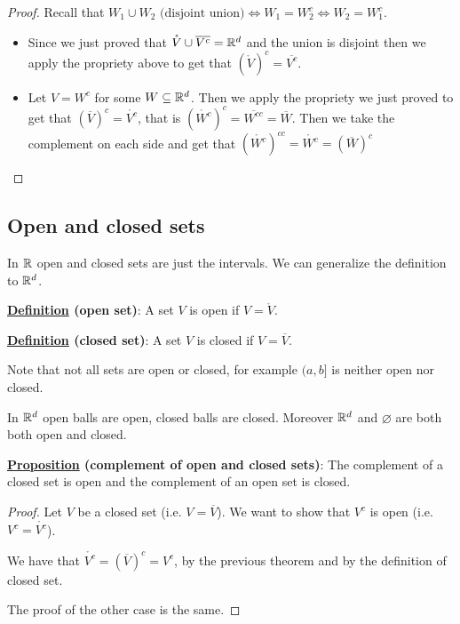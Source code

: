 \documentclass[10pt]{extarticle}
\begin{document}
\begin{proof}
                    Recall that $W_1 \cup W_2 \text{ (disjoint union)} \iff W_1 = W_2^c \iff W_2 = W_1^c$.

                    \begin{itemize}
                        \item Since we just proved that $\mathring{V} \cup \overline{V^c} = \mathbb{R}^d$ and the union is disjoint then we apply the propriety above to get that $\left(\mathring{V}\right)^c = \overline{V^c}$.
                        \item Let $V = W^c$ for some $W \subseteq \mathbb{R}^d$.
                              Then we apply the propriety we just proved to get that $\left(\overline{V}\right)^c = \mathring{V^c}$, that is $\left(\mathring{W^c}\right)^c = \overline{W^{cc}} = \overline{W}$.
                              Then we take the complement on each side and get that $\left(\mathring{W^c}\right)^{cc} = \mathring{W^c} = \left(\overline{W}\right)^c$
                    \end{itemize}
                \end{proof}

                \subsection{Open and closed sets}

                In $\mathbb{R}$ open and closed sets are just the intervals. We can generalize the definition to $\mathbb{R}^d$.

                \textbf{\underline{Definition} (open set)}: A set $V$ is open if $V = \mathring{V}$.

                \textbf{\underline{Definition} (closed set)}: A set $V$ is closed if $V = \overline{V}$.

                Note that not all sets are open or closed, for example $(a, b]$ is neither open nor closed.

In $\mathbb{R}^d$ open balls are open, closed balls are closed.
Moreover $\mathbb{R}^d$ and $\varnothing$ are both both open and closed.

\textbf{\underline{Proposition} (complement of open and closed sets)}:
The complement of a closed set is open and the complement of an open set is closed.

\begin{proof}
    Let $V$ be a closed set (i.e. $V = \overline{V}$).
    We want to show that $V^c$ is open (i.e. $V^c = \mathring{V^c}$).

    We have that $\mathring{V^c} = \left(\overline{V}\right)^c = V^c$, by the previous theorem and by the definition of closed set.

    The proof of the other case is the same.
\end{proof}
\end{document}
